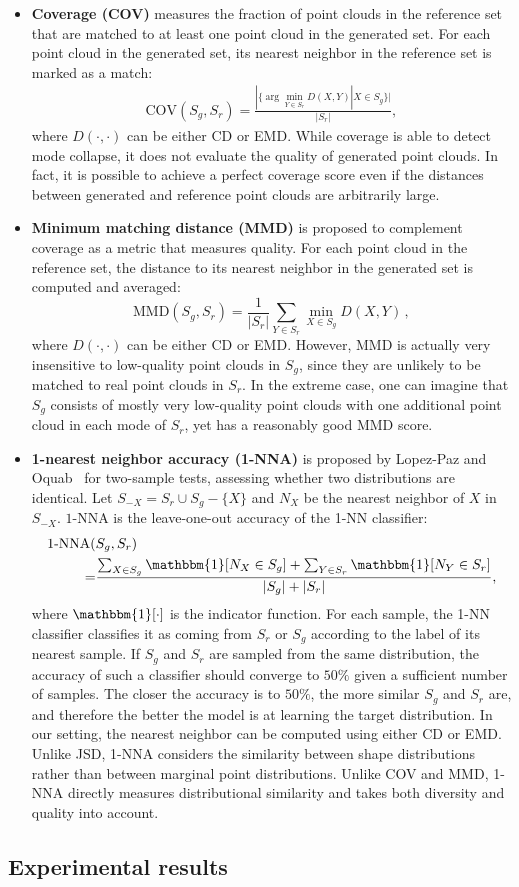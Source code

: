\begin{itemize}
	\item\textbf{Coverage (COV)} measures the fraction of point clouds in the reference set that are matched to at least one point cloud in the generated set. For each point cloud in the generated set, its nearest neighbor in the reference set is marked as a match:
	\begin{align*}
	\text{COV}(S_g, S_r) = \frac{|\{\arg\min_{Y \in S_r} D(X,Y) | X \in S_g \}|}{|S_r|},
	\end{align*}
	where $D(\cdot, \cdot)$ can be either CD or EMD. While coverage is able to detect mode collapse, it does not evaluate the quality of generated point clouds. In fact, it is possible to achieve a perfect coverage score even if the distances between generated and reference point clouds are arbitrarily large.
	\item\textbf{Minimum matching distance (MMD)} is proposed to complement coverage as a metric that measures quality. For each point cloud in the reference set, the distance to its nearest neighbor in the generated set is computed and averaged:
	\begin{equation}
	\text{MMD}(S_g, S_r) = \frac{1}{|S_r|}\sum_{Y\in S_r} \min_{X\in S_g} D(X,Y)\,,\nonumber
	\end{equation}
	where $D(\cdot, \cdot)$ can be either CD or EMD. However, MMD is actually very insensitive to low-quality point clouds in $S_g$, since they are unlikely to be matched to real point clouds in $S_r$. In the extreme case, one can imagine that $S_g$ consists of mostly very low-quality point clouds with one additional point cloud in each mode of $S_r$, yet has a reasonably good MMD score.
	\item \textbf{1-nearest neighbor accuracy (1-NNA)} is proposed by Lopez-Paz and Oquab~\cite{1-nna} for two-sample tests, assessing whether two distributions are identical.
	Let $S_{-X} = S_r \cup S_g - \{X\}$ and $N_X$ be the nearest neighbor of $X$ in $S_{-X}$. $1$-NNA is the leave-one-out accuracy of the 1-NN classifier:
	\begin{align*}
	\text{1-NNA}(&S_g, S_r) \\
	=&\frac{\sum_{X\in S_g} \mathbbm{1}[N_X \in S_g] +  \sum_{Y\in S_r} \mathbbm{1}[N_Y \in S_r]}{|S_g|+|S_r|} ,
	\end{align*}
	where $\mathbbm{1}[\cdot]$ is the indicator function.
	For each sample, the 1-NN classifier classifies it as coming from $S_r$ or $S_g$ according to the label of its nearest sample.
	If $S_g$ and $S_r$ are sampled from the same distribution, the accuracy of such a classifier should converge to $50\%$ given a sufficient number of samples. The closer the accuracy is to $50\%$, the more similar $S_g$ and $S_r$ are, and therefore the better the model is at learning the target distribution. In our setting, the nearest neighbor can be computed using either CD or EMD. Unlike JSD, 1-NNA considers the similarity between shape distributions rather than between marginal point distributions. Unlike COV and MMD, 1-NNA directly measures distributional similarity and takes both diversity and quality into account.
\end{itemize}

\subsection{Experimental results}
\label{subsec:result}

